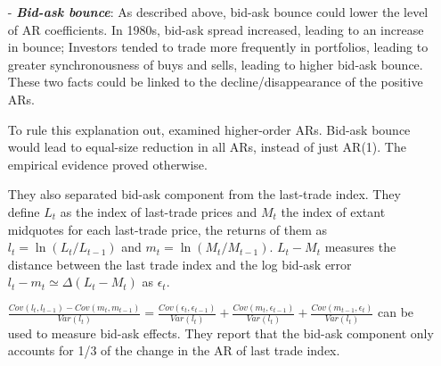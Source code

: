 \begin{enumerate}
    \item[-] \textbf{\textit{Bid-ask bounce}}: As described above, bid-ask bounce could lower the level of AR coefficients. In 1980s, bid-ask spread increased, leading to an increase in bounce; Investors tended to
    trade more frequently in portfolios, leading to greater synchronousness of buys and sells, leading to higher bid-ask bounce. These two facts could be linked to the decline/disappearance of the positive ARs.
    
    To rule this explanation out, \citeauthor{froot1995new} examined higher-order ARs. Bid-ask bounce would lead to equal-size reduction in all ARs, instead of just AR(1). The empirical evidence proved otherwise.
    
    They also separated bid-ask component from the last-trade index. They define $L_t$ as the index of last-trade prices and $M_t$ the index of extant midquotes for each last-trade price, the returns of them
    as $l_t=\ln(L_t/L_{t-1})$ and $m_t=\ln(M_t/M_{t-1})$. $L_t-M_t$ measures the distance between the last trade index and the log bid-ask error $l_t-m_t\simeq\Delta(L_t-M_t)$ as $\epsilon_t$. 

    $\frac{Cov(l_t,l_{t-1})-Cov(m_t,m_{t-1})}{Var(l_t)} = \frac{Cov(\epsilon_t,\epsilon_{t-1})}{Var(l_t)}+ \frac{Cov(m_t,\epsilon_{t-1})}{Var(l_t)}+\frac{Cov(m_{t-1},\epsilon_t)}{Var(l_t)}$ can be used to measure bid-ask effects. They report that the bid-ask component only
    accounts for 1/3 of the change in the AR of last trade index.
    

\end{enumerate}

